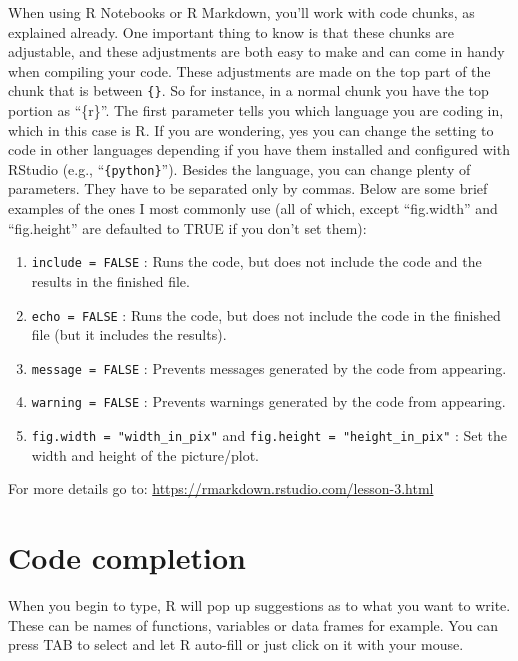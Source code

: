 \documentclass[
]{book}
\providecommand{\tightlist}{%
  \setlength{\itemsep}{0pt}\setlength{\parskip}{0pt}}
\begin{document}
When using R Notebooks or R Markdown, you'll work with code chunks, as explained already.
One important thing to know is that these chunks are adjustable, and these adjustments are both easy to make and can come in handy when compiling your code.
These adjustments are made on the top part of the chunk that is between \texttt{\{\}}.
So for instance, in a normal chunk you have the top portion as ``\{r\}''.
The first parameter tells you which language you are coding in, which in this case is R.
If you are wondering, yes you can change the setting to code in other languages depending if you have them installed and configured with RStudio (e.g., ``\texttt{\{python\}}'').
Besides the language, you can change plenty of parameters.
They have to be separated only by commas.
Below are some brief examples of the ones I most commonly use (all of which, except ``fig.width'' and ``fig.height'' are defaulted to TRUE if you don't set them):

\begin{enumerate}
\def\labelenumi{\arabic{enumi}.}
\tightlist
\item
  \texttt{include\ =\ FALSE} : Runs the code, but does not include the code and the results in the finished file.
\item
  \texttt{echo\ =\ FALSE} : Runs the code, but does not include the code in the finished file (but it includes the results).
\item
  \texttt{message\ =\ FALSE} : Prevents messages generated by the code from appearing.
\item
  \texttt{warning\ =\ FALSE} : Prevents warnings generated by the code from appearing.
\item
  \texttt{fig.width\ =\ "width\_in\_pix"} and \texttt{fig.height\ =\ "height\_in\_pix"} : Set the width and height of the picture/plot.
\end{enumerate}

For more details go to: \url{https://rmarkdown.rstudio.com/lesson-3.html}

\hypertarget{code-completion}{%
\section{Code completion}\label{code-completion}}

When you begin to type, R will pop up suggestions as to what you want to write.
These can be names of functions, variables or data frames for example.
You can press TAB to select and let R auto-fill or just click on it with your mouse.
\end{document}
